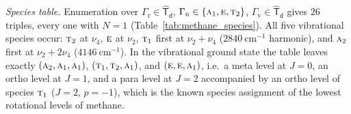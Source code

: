 \documentclass[
  reprint,
  aps,
  prx,
  superscriptaddress,
  amsmath,
  amssymb,
  longbibliography
]{revtex4-2}
\newcommand{\grp}[1]{\mathsf{#1}}
\newcommand{\irr}[1]{\text{\normalfont\scshape #1}}
\newcommand{\parity}{p}               %
\providecommand{\Grot}{\Gamma_{\mathrm{r}}}
\providecommand{\Gvib}{\Gamma_{\mathrm{v}}}
\providecommand{\Gspin}{\Gamma_{\mathrm{n}}}
\begin{document}
\emph{Species table.} Enumeration over $\Grot\in\grp{\widehat{T}_{d}}$, $\Gspin\in\{\irr{a}_{1},\irr{e},\irr{t}_{2}\}$, $\Gvib\in\grp{\widehat{T}_{d}}$ gives $26$ triples, every one with $N=1$ (Table~\ref{tab:methane_species}). All five vibrational species occur: $\irr{t}_{2}$ at $\nu_4$, $\irr{e}$ at $\nu_2$, $\irr{t}_{1}$ first at $\nu_2+\nu_4$ ($2840\ \mathrm{cm^{-1}}$ harmonic), and $\irr{a}_{2}$ first at $\nu_2+2\nu_4$ ($4146\ \mathrm{cm^{-1}}$). In the vibrational ground state the table leaves exactly $(\irr{a}_{2},\irr{a}_{1},\irr{a}_{1})$, $(\irr{t}_{1},\irr{t}_{2},\irr{a}_{1})$, and $(\irr{e},\irr{e},\irr{a}_{1})$, i.e.\ a meta level at $J=0$, an ortho level at $J=1$, and a para level at $J=2$ accompanied by an ortho level of species $\irr{t}_{1}$ ($J=2$, $\parity=-1$), which is the known species assignment of the lowest rotational levels of methane.
\end{document}
